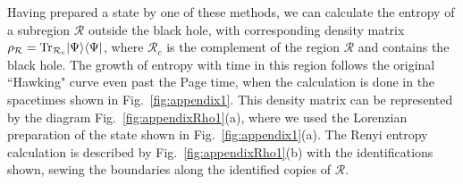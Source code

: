 \documentclass[12pt]{article}
\numberwithin{equation}{section}
\begin{document}
Having prepared a state by one of these methods, we can calculate the entropy of a subregion $\mathcal{R}$ outside the black hole, with corresponding  density matrix $\rho_{\mathcal{R}}= {\rm Tr}_{\mathcal{R}_c} |\Psi \rangle \langle \Psi |$, where $ \mathcal{R}_c$ is the complement of the region $\mathcal{R}$ and contains the black hole. The growth of entropy with time in this region follows the original ``Hawking" curve even past the Page time, when the calculation is done in the spacetimes shown in Fig.~\ref{fig:appendix1}. This density matrix can be represented by the diagram Fig.~\ref{fig:appendixRho1}(a), where we used the Lorenzian preparation of the state shown in Fig.~\ref{fig:appendix1}(a). The Renyi entropy calculation is described by Fig.~\ref{fig:appendixRho1}(b) with the identifications shown, sewing the boundaries along the identified copies of $\mathcal{R}$. 
\end{document}
